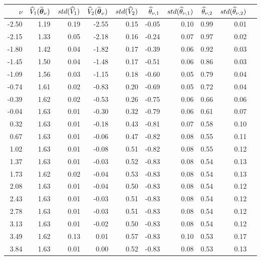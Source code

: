 \begin{tabular}{rrrrrrrrrr}\hline 
$\nu$  & $\widehat{V}_1(\widehat{\boldsymbol{\theta}}_{\nu})$ & $std(\widehat{V}_1)$ & $\widehat{V}_2(\widehat{\boldsymbol{\theta}}_{\nu})$ & $std(\widehat{V}_2)$ & $\widehat{\theta}_{\nu,1}$ & $std(\widehat{\theta}_{\nu,1})$ & $\widehat{\theta}_{\nu,2}$ & $std(\widehat{\theta}_{\nu,2})$ \\ \hline 
-2.50 &     1.19 &     0.19  &    -2.55 &      0.15 &     -0.05 &      0.10 &      0.99 &      0.01 \\ 
-2.15 &     1.33 &     0.05  &    -2.18 &      0.16 &     -0.24 &      0.07 &      0.97 &      0.02 \\ 
-1.80 &     1.42 &     0.04  &    -1.82 &      0.17 &     -0.39 &      0.06 &      0.92 &      0.03 \\ 
-1.45 &     1.50 &     0.04  &    -1.48 &      0.17 &     -0.51 &      0.06 &      0.86 &      0.03 \\ 
-1.09 &     1.56 &     0.03  &    -1.15 &      0.18 &     -0.60 &      0.05 &      0.79 &      0.04 \\ 
-0.74 &     1.61 &     0.02  &    -0.83 &      0.20 &     -0.69 &      0.05 &      0.72 &      0.04 \\ 
-0.39 &     1.62 &     0.02  &    -0.53 &      0.26 &     -0.75 &      0.06 &      0.66 &      0.06 \\ 
-0.04 &     1.63 &     0.01  &    -0.30 &      0.32 &     -0.79 &      0.06 &      0.61 &      0.07 \\ 
 0.32 &     1.63 &     0.01  &    -0.18 &      0.43 &     -0.81 &      0.07 &      0.58 &      0.10 \\ 
 0.67 &     1.63 &     0.01  &    -0.06 &      0.47 &     -0.82 &      0.08 &      0.55 &      0.11 \\ 
 1.02 &     1.63 &     0.01  &    -0.08 &      0.51 &     -0.82 &      0.08 &      0.55 &      0.12 \\ 
 1.37 &     1.63 &     0.01  &    -0.03 &      0.52 &     -0.83 &      0.08 &      0.54 &      0.13 \\ 
 1.73 &     1.62 &     0.02  &    -0.04 &      0.53 &     -0.83 &      0.08 &      0.54 &      0.13 \\ 
 2.08 &     1.63 &     0.01  &    -0.04 &      0.50 &     -0.83 &      0.08 &      0.54 &      0.12 \\ 
 2.43 &     1.63 &     0.01  &    -0.03 &      0.51 &     -0.83 &      0.08 &      0.54 &      0.12 \\ 
 2.78 &     1.63 &     0.01  &    -0.03 &      0.51 &     -0.83 &      0.08 &      0.54 &      0.12 \\ 
 3.13 &     1.63 &     0.01  &    -0.02 &      0.50 &     -0.83 &      0.08 &      0.54 &      0.12 \\ 
 3.49 &     1.62 &     0.13  &     0.01 &      0.57 &     -0.83 &      0.10 &      0.53 &      0.17 \\ 
 3.84 &     1.63 &     0.01  &     0.00 &      0.52 &     -0.83 &      0.08 &      0.53 &      0.13 \\ \hline 
\end{tabular}
